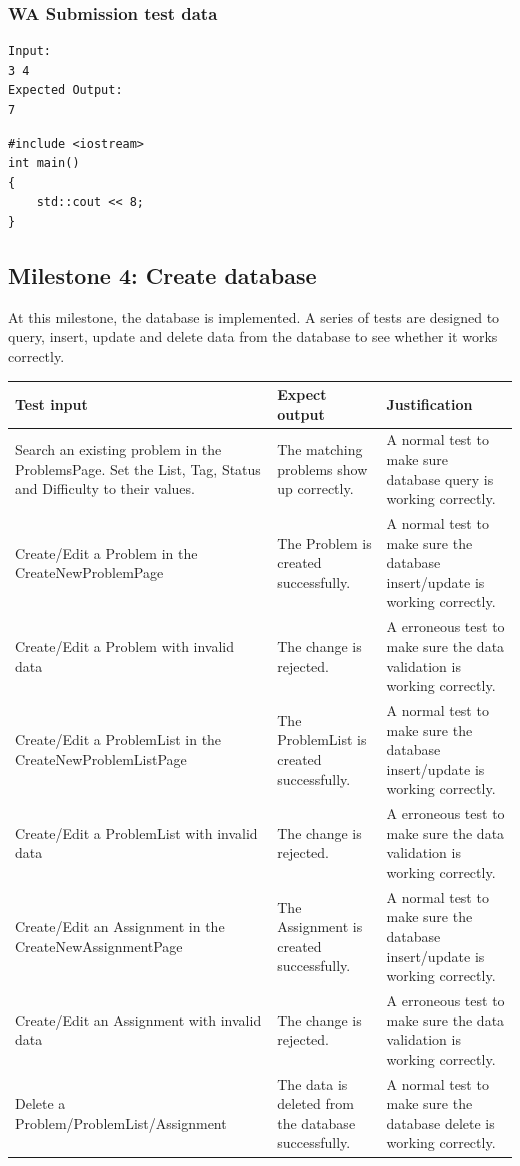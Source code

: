 \documentclass[a4paper]{report}
\begin{document}
\subsubsection{WA Submission test data}

\begin{verbatim}
Input:
3 4
Expected Output:
7 
\end{verbatim}

\begin{verbatim}
#include <iostream>
int main()
{
    std::cout << 8;
}
\end{verbatim}

\subsection{Milestone 4: Create database}

At this milestone, the database is implemented. A series of tests are designed to query, insert, update and delete data from the database to see whether it works correctly.

\begin{tabulary}{\textwidth}{|L|L|L|}
    \hline
    Test input & Expect output & Justification \\
    \hline
    Search an existing problem in the ProblemsPage. Set the List, Tag, Status and Difficulty to their values. & The matching problems show up correctly. & A normal test to make sure database query is working correctly. \\
    \hline
    Create/Edit a Problem in the CreateNewProblemPage & The Problem is created successfully. & A normal test to make sure the database insert/update is working correctly. \\
    \hline
    Create/Edit a Problem with invalid data & The change is rejected. & A erroneous test to make sure the data validation is working correctly. \\
    \hline
    Create/Edit a ProblemList in the CreateNewProblemListPage & The ProblemList is created successfully. & A normal test to make sure the database insert/update is working correctly. \\
    \hline
    Create/Edit a ProblemList with invalid data & The change is rejected. & A erroneous test to make sure the data validation is working correctly. \\
    \hline
    Create/Edit an Assignment in the CreateNewAssignmentPage & The Assignment is created successfully. & A normal test to make sure the database insert/update is working correctly. \\
    \hline
    Create/Edit an Assignment with invalid data & The change is rejected. & A erroneous test to make sure the data validation is working correctly. \\
    \hline
    Delete a Problem/ProblemList/Assignment & The data is deleted from the database successfully. & A normal test to make sure the database delete is working correctly. \\
    \hline
\end{tabulary}
\end{document}
